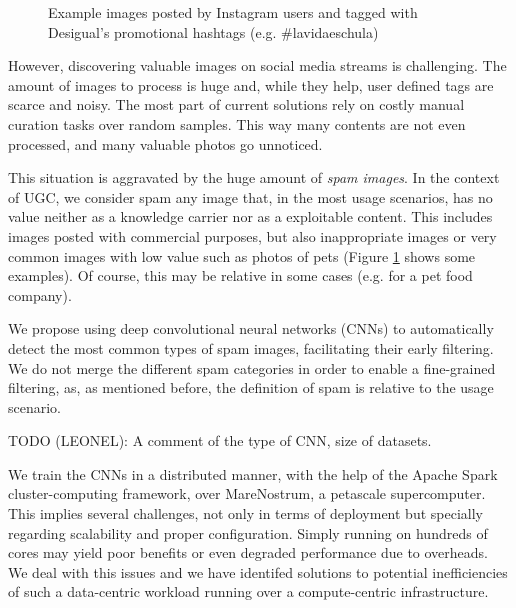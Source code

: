 \documentclass[smallextended]{svjour3}       %
\begin{document}
\begin{figure}
\caption{Example images posted by Instagram users and tagged with Desigual's promotional hashtags (e.g. \#lavidaeschula)}
\label{fig:spamexamples}
\end{figure}

However, discovering valuable images on social media streams is challenging. The amount of images to process is huge and, while they help, user defined tags are scarce and noisy. The most part of current solutions rely on costly manual curation tasks over random samples. This way many contents are not even processed, and many valuable photos go unnoticed. 

This situation is aggravated by the huge amount of \textit{spam images}. In the context of UGC, we consider spam any image that, in the most usage scenarios, has no value neither as a knowledge carrier nor as a exploitable content. This includes images posted with commercial purposes, but also inappropriate images or very common images with low value such as photos of pets (Figure \ref{fig:spamexamples} shows some examples). Of course, this may be relative in some cases (e.g. for a pet food company).  

We propose using deep convolutional neural networks (CNNs) to automatically detect the most common types of spam images, facilitating their early filtering. We do not merge the different spam categories in order to enable a fine-grained filtering, as, as mentioned before, the definition of spam is relative to the usage scenario. 

TODO (LEONEL): A comment of the type of CNN, size of datasets.

We train the CNNs in a distributed manner, with the help of the Apache Spark cluster-computing framework, over MareNostrum, a petascale supercomputer. This implies several challenges, not only in terms of deployment but specially regarding scalability and proper configuration. Simply running on hundreds of cores may yield poor benefits or even degraded performance due to overheads. We deal with this issues and we have identifed solutions to potential inefficiencies of such a data-centric workload running over a compute-centric infrastructure.
\end{document}
